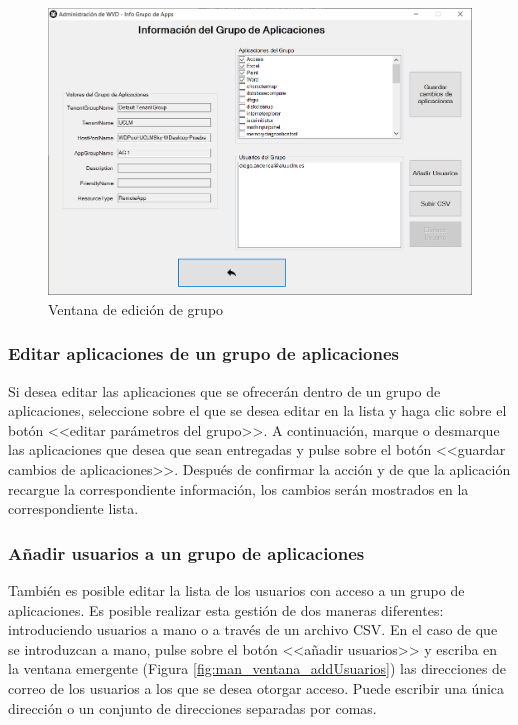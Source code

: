\begin{figure}[h]
  \centering
  \includegraphics[width=0.8\linewidth]{figures/images/script/ventana_editargrupo.PNG}
  \caption{Ventana de edición de grupo}
  \label{fig:man_ventana_editargrupo}
\end{figure}

\subsubsection{Editar aplicaciones de un grupo de aplicaciones}
Si desea editar las aplicaciones que se ofrecerán dentro de un grupo de aplicaciones, seleccione sobre el que se desea editar en la lista y haga clic sobre el botón <<editar parámetros del grupo>>. A continuación, marque o desmarque las aplicaciones que desea que sean entregadas y pulse sobre el botón <<guardar cambios de aplicaciones>>. Después de confirmar la acción y de que la aplicación recargue la correspondiente información, los cambios serán mostrados en la correspondiente lista.

\clearpage

\subsubsection{Añadir usuarios a un grupo de aplicaciones}
También es posible editar la lista de los usuarios con acceso a un grupo de aplicaciones. Es posible realizar esta gestión de dos maneras diferentes: introduciendo usuarios a mano o a través de un archivo \acs{CSV}. En el caso de que se introduzcan a mano, pulse sobre el botón <<añadir usuarios>> y escriba en la ventana emergente (Figura  \ref{fig:man_ventana_addUsuarios}) las direcciones de correo de los usuarios a los que se desea otorgar acceso. Puede escribir una única dirección o un conjunto de direcciones separadas por comas.

